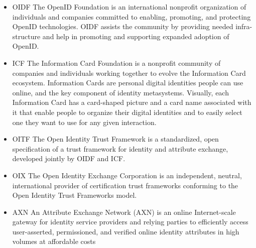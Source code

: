 \documentclass[../CIT288SecurityResearchNotebook.tex]{subfiles}
\begin{document}
\begin{itemize}\centering
	\item{OIDF} The OpenID Foundation is an international nonprofit 
		organization of individuals and companies committed to enabling, 
		promoting, and protecting OpenID technologies. OIDF assists the 
		community by providing needed infra- structure and help in promoting 
		and supporting expanded adoption of OpenID.
	\item{ICF} The Information Card Foundation is a nonprofit community of 
		companies and individuals working together to evolve the 
		Information Card ecosystem. Information Cards are personal 
		digital identities people can use online, and the key 
		component of identity metasystems.  Visually, each 
		Information Card has a card-shaped picture and a card 
		name associated with it that enable people to organize their digital 
		identities and to easily select one they want to use for any given 
		interaction.
	\item{OITF} The Open Identity Trust Framework is a standardized,
		open specification of a trust framework for identity and attribute 
		exchange, developed jointly by OIDF and ICF.
	\item{OIX} The Open Identity Exchange Corporation is an independent, 
		neutral, international provider of certification trust frameworks 
		conforming to the Open Identity Trust Frameworks model.
	\item{AXN} An Attribute Exchange Network (AXN) is an online 
		Internet-scale gateway for identity service providers 
		and relying parties to efficiently access user-asserted, 
		permissioned, and verified online identity attributes in 
		high volumes at affordable costs
\end{itemize}

\end{document}
